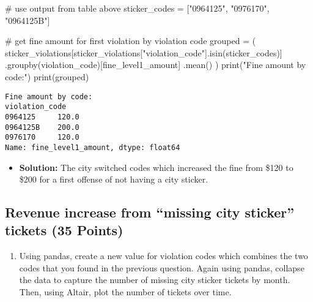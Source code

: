 \documentclass[
  letterpaper,
  DIV=11,
  numbers=noendperiod]{scrartcl}
\newenvironment{Shaded}{\begin{snugshade}}{\end{snugshade}}
\newcommand{\BuiltInTok}[1]{\textcolor[rgb]{0.00,0.23,0.31}{#1}}
\newcommand{\CommentTok}[1]{\textcolor[rgb]{0.37,0.37,0.37}{#1}}
\newcommand{\NormalTok}[1]{\textcolor[rgb]{0.00,0.23,0.31}{#1}}
\newcommand{\OperatorTok}[1]{\textcolor[rgb]{0.37,0.37,0.37}{#1}}
\newcommand{\StringTok}[1]{\textcolor[rgb]{0.13,0.47,0.30}{#1}}
\providecommand{\tightlist}{%
  \setlength{\itemsep}{0pt}\setlength{\parskip}{0pt}}\usepackage{longtable,booktabs,array}
\begin{document}
\begin{Shaded}
\begin{Highlighting}[]
\CommentTok{\# use output from table above}
\NormalTok{sticker\_codes }\OperatorTok{=}\NormalTok{ [}\StringTok{"0964125"}\NormalTok{, }\StringTok{"0976170"}\NormalTok{, }\StringTok{"0964125B"}\NormalTok{]}

\CommentTok{\# get fine amount for first violation by violation code}
\NormalTok{grouped }\OperatorTok{=}\NormalTok{ (}
\NormalTok{    sticker\_violations[sticker\_violations[}\StringTok{"violation\_code"}\NormalTok{].isin(sticker\_codes)]}
\NormalTok{    .groupby(}\StringTok{\textquotesingle{}violation\_code\textquotesingle{}}\NormalTok{)[}\StringTok{\textquotesingle{}fine\_level1\_amount\textquotesingle{}}\NormalTok{]}
\NormalTok{    .mean()}
\NormalTok{)}
\BuiltInTok{print}\NormalTok{(}\StringTok{"Fine amount by code:"}\NormalTok{)}
\BuiltInTok{print}\NormalTok{(grouped)}
\end{Highlighting}
\end{Shaded}

\begin{verbatim}
Fine amount by code:
violation_code
0964125     120.0
0964125B    200.0
0976170     120.0
Name: fine_level1_amount, dtype: float64
\end{verbatim}

\begin{itemize}
\tightlist
\item
  \textbf{Solution:} The city switched codes which increased the fine
  from \$120 to \$200 for a first offense of not having a city sticker.
\end{itemize}

\subsection{Revenue increase from ``missing city sticker'' tickets (35
Points)}\label{revenue-increase-from-missing-city-sticker-tickets-35-points}

\begin{enumerate}
\def\labelenumi{\arabic{enumi}.}
\tightlist
\item
  Using pandas, create a new value for violation codes which combines
  the two codes that you found in the previous question. Again using
  pandas, collapse the data to capture the number of missing city
  sticker tickets by month. Then, using Altair, plot the number of
  tickets over time.
\end{enumerate}
\end{document}
